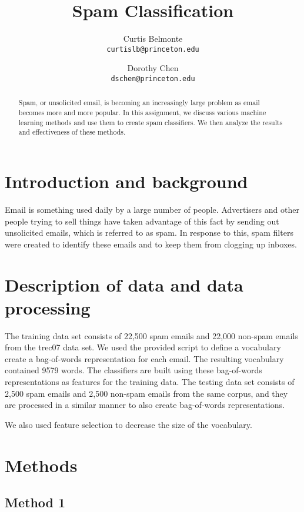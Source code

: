 \documentclass{article} %
\title{Spam Classification}
\author{Curtis Belmonte\\
{\tt\small curtislb@princeton.edu}
\and
Dorothy Chen\\
{\tt\small dschen@princeton.edu}
}
\begin{document}
\maketitle

\begin{abstract}
Spam, or unsolicited email, is becoming an increasingly large problem as email becomes more and more popular. In this assignment, we discuss various machine learning methods and use them to create spam classifiers. We then analyze the results and effectiveness of these methods. 
\end{abstract}

\section{Introduction and background}
Email is something used daily by a large number of people. Advertisers and other people trying to sell things have taken advantage of this fact by sending out unsolicited emails, which is referred to as spam. In response to this, spam filters were created to identify these emails and to keep them from clogging up inboxes.

\section{Description of data and data processing}
The training data set consists of 22,500 spam emails and 22,000 non-spam emails from the trec07 data set. We used the provided script to define a vocabulary create a bag-of-words representation for each email. The resulting vocabulary contained 9579 words. The classifiers are built using these bag-of-words representations as features for the training data. The testing data set consists of 2,500 spam emails and 2,500 non-spam emails from the same corpus, and they are processed in a similar manner to also create bag-of-words representations. 

We also used feature selection to decrease the size of the vocabulary.

\section{Methods}
\subsection{Method 1}
\end{document}
